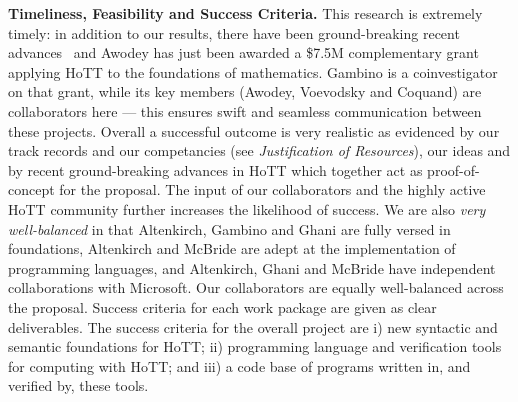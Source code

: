 \documentclass[a4paper,11pt]{article}
\begin{document}






{\bf Timeliness, Feasibility and Success Criteria.}  This research is
extremely timely: in addition to our results, there have been
ground-breaking recent advances~\cite{ShulmanM:uniidh,BezemM:cubsmt, nominal} and Awodey has just
been awarded a \$7.5M complementary grant applying HoTT to the
foundations of mathematics. Gambino is a coinvestigator on that grant,
while its key members (Awodey, Voevodsky and Coquand) are
collaborators here --- this ensures swift and seamless communication
between these projects.  Overall a successful outcome is very realistic
as evidenced by our track records and our competancies (see {\em
  Justification of Resources}), our ideas and by recent 
ground-breaking advances in HoTT which together act as
proof-of-concept for the proposal. The input of our collaborators and
the highly active HoTT community further increases the likelihood of
success. We are also {\em very well-balanced} in that Altenkirch,
Gambino and Ghani are fully versed in foundations, Altenkirch and
McBride are adept at the implementation of programming languages, and
Altenkirch, Ghani and McBride have independent collaborations with Microsoft. Our
collaborators are equally well-balanced across the 
proposal. Success criteria for each work package are given as clear
deliverables. The success criteria for the overall project are i) new
syntactic and semantic foundations for HoTT; ii) programming language
and verification tools for computing with HoTT; and iii) a code base
of programs written in, and verified by, these tools.  

\end{document}
